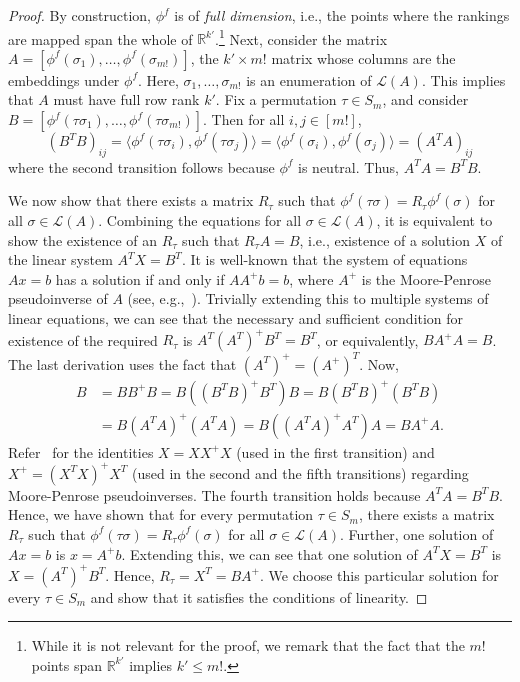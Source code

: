 \documentclass[prodmode]{acmsmall-ec14}
\newcommand{\calL}{{\mathcal{L}}}
\newcommand{\rank}{{\calL(A)}}
\begin{document}
\begin{proof}
By construction, $\phi^f$ is of \emph{full dimension}, i.e., the points where the rankings are mapped span the whole of $\mathbb{R}^{k'}$.\footnote{While it is not relevant for the proof, we remark that the fact that the $m!$ points span $\mathbb{R}^{k'}$ implies $k' \le m!$.} Next, consider the matrix $A = [\phi^f(\sigma_1), \ldots, \phi^f(\sigma_{m!})]$, the $k' \times m!$ matrix whose columns are the embeddings under $\phi^f$. Here, $\sigma_1,\ldots,\sigma_{m!}$ is an enumeration of $\rank$. This implies that $A$ must have full row rank $k'$. Fix a permutation $\tau \in S_m$, and consider $B = [\phi^f(\tau \sigma_1), \ldots, \phi^f(\tau \sigma_{m!})]$. Then for all $i,j \in [m!]$, 
$$
(B^T B)_{ij} = \langle \phi^f(\tau \sigma_i), \phi^f(\tau \sigma_j) \rangle = \langle \phi^f(\sigma_i), \phi^f(\sigma_j) \rangle = (A^T A)_{ij}
$$
where the second transition follows because $\phi^f$ is neutral. Thus, $A^T A = B^T B$.

We now show that there exists a matrix $R_{\tau}$ such that $\phi^f(\tau \sigma) = R_{\tau} \phi^f(\sigma)$ for all $\sigma \in \rank$. Combining the equations for all $\sigma \in \rank$, it is equivalent to show the existence of an $R_{\tau}$ such that $R_{\tau} A = B$, i.e., existence of a solution $X$ of the linear system $A^T X = B^T$. It is well-known that the system of equations $Ax=b$ has a solution if and only if $AA^{+}b = b$, where $A^{+}$ is the Moore-Penrose pseudoinverse of $A$ (see, e.g.,~\cite{BH12}). Trivially extending this to multiple systems of linear equations, we can see that the necessary and sufficient condition for existence of the required $R_{\tau}$ is $A^T (A^T)^{+} B^T = B^T$, or equivalently, $B A^{+} A = B$. The last derivation uses the fact that $(A^T)^{+} = (A^{+})^T$. Now, 
\begin{align*}
B &= B B^{+} B = B \left( (B^T B)^{+} B^T \right) B = B (B^T B)^{+} \left( B^T B \right) \\
&= B (A^T A)^{+} \left( A^T A \right) = B \left( (A^T A)^{+} A^T \right) A = B A^{+} A.
\end{align*}
Refer~\cite{BH12} for the identities $X = X X^{+} X$ (used in the first transition) and $X^{+} = (X^T X)^{+} X^T$ (used in the second and the fifth transitions) regarding Moore-Penrose pseudoinverses. The fourth transition holds because $A^T A = B^T B$. Hence, we have shown that for every permutation $\tau \in S_m$, there exists a matrix $R_{\tau}$ such that $\phi^f(\tau \sigma) = R_{\tau} \phi^f(\sigma)$ for all $\sigma \in \rank$. Further, one solution of $Ax=b$ is $x = A^{+}b$. Extending this, we can see that one solution of $A^T X = B^T$ is $X = (A^T)^{+} B^T$. Hence, $R_{\tau} = X^T = BA^{+}$. We choose this particular solution for every $\tau \in S_m$ and show that it satisfies the conditions of linearity. 


\end{proof}
\end{document}
